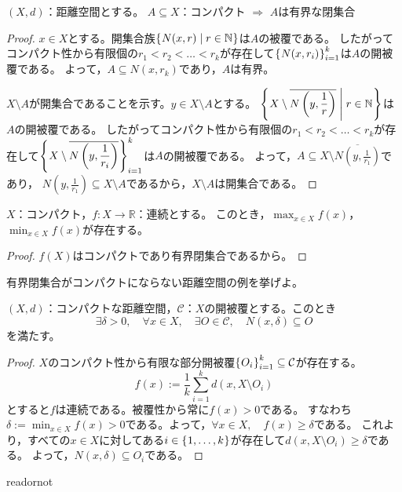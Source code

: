 \documentclass[uplatex]{jsarticle}
\begin{document}
\begin{hodai}
  $(X, d)$：距離空間とする。
  $A \subseteq X$：コンパクト $\Longrightarrow$ $A$は有界な閉集合
\end{hodai}

\begin{proof}
   $x \in X$とする。開集合族$\Set{\hspace{-1.8pt} N(x,r) | r \in \mathbb{N} \hspace{-1.8pt}}$は$A$の被覆である。
  したがってコンパクト性から有限個の$r_{1} < r_{2} < \dots < r_{k}$が存在して$\Set{\hspace{-1.8pt} N(x,r_{i}) \hspace{-1.8pt}}_{i=1}^{k}$は$A$の開被覆である。
  よって，$A \subseteq N(x,r_{k})$であり，$A$は有界。

   $X \setminus A$が開集合であることを示す。$y \in X \setminus A$とする。
  ${\displaystyle \Set{\hspace{-1.8pt} X \setminus \overline{N \left( y, \frac{1}{r} \right)} | r \in \mathbb{N} \hspace{-1.8pt}}}$は$A$の開被覆である。
  したがってコンパクト性から有限個の$r_{1} < r_{2} < \dots < r_{k}$が存在して${\displaystyle \Set{\hspace{-1.8pt} X \setminus \overline{N \left( y,\frac{1}{r_{i}} \right)} \hspace{-1.8pt}}_{i=1}^{k}}$は$A$の開被覆である。
  よって，${\displaystyle A \subseteq X \setminus \overline{N \left( y,\frac{1}{r_{1}} \right)}}$であり，
  ${\displaystyle N \left( y, \frac{1}{r_{1}} \right) \subseteq X \setminus A}$であるから，$X \setminus A$は開集合である。
\end{proof}

\begin{corr}
  $X$：コンパクト，$f \colon X \longrightarrow \mathbb{R}$：連続とする。
  このとき，${\displaystyle \max_{x \in X} f(x)}$，${\displaystyle \min_{x \in X} f(x)}$が存在する。
\end{corr}

\begin{proof}
  $f(X)$はコンパクトであり有界閉集合であるから。
\end{proof}

 有界閉集合がコンパクトにならない距離空間の例を挙げよ。

\begin{hodai}[Lebesgue数の補題]
  $(X,d)$：コンパクトな距離空間，$\mathcal{C}$：$X$の開被覆とする。このとき
  \begin{equation}
    \exists \delta > 0, \quad \forall x \in X, \quad \exists O \in \mathcal{C}, \quad N(x, \delta) \subseteq O
  \end{equation}
  を満たす。
\end{hodai}

\begin{proof}
  $X$のコンパクト性から有限な部分開被覆$\Set{\hspace{-1.8pt} O_{i} \hspace{-1.8pt}}_{i=1}^{k} \subseteq \mathcal{C}$が存在する。
  \begin{equation}
    f(x) := \frac{1}{k} \sum_{i=1}^{k} d(x, X \setminus O_{i})
  \end{equation}
  とすると$f$は連続である。被覆性から常に$f(x) > 0$である。
  すなわち${\displaystyle \delta := \min_{x \in X} f(x) > 0}$である。よって，$\forall x \in X, \quad f(x) \ge \delta$である。
  これより，すべての$x \in X$に対してある$i \in \Set{\hspace{-1.8pt} 1,\dots,k \hspace{-1.8pt}}$が存在して$d(x, X \setminus O_{i}) \ge \delta$である。
  よって，$N(x, \delta) \subseteq O_{i}$である。
\end{proof}

\expandafter\ifx\csname readornot\endcsname\relax
  
\end{document}
